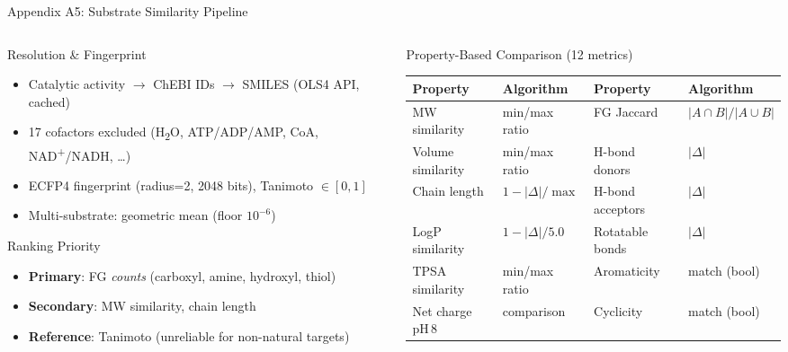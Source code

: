 \documentclass[aspectratio=169, 11pt]{beamer}
\begin{document}
\begin{frame}{Appendix A5: Substrate Similarity Pipeline}
\vspace{-8pt}
\begin{columns}[T]
\begin{column}{0.48\textwidth}
\begin{block}{\small Resolution \& Fingerprint}
\vspace{-2pt}
\begin{itemize}\scriptsize
\setlength\itemsep{0pt}
\item Catalytic activity $\rightarrow$ ChEBI IDs $\rightarrow$ SMILES (OLS4 API, cached)
\item 17 cofactors excluded (H\textsubscript{2}O, ATP/ADP/AMP, CoA, NAD\textsuperscript{+}/NADH, \ldots)
\item ECFP4 fingerprint (radius=2, 2048 bits), Tanimoto $\in [0,1]$
\item Multi-substrate: geometric mean (floor $10^{-6}$)
\end{itemize}
\end{block}

\begin{alertblock}{\small Ranking Priority}
\vspace{-2pt}
\begin{itemize}\scriptsize
\setlength\itemsep{-1pt}
\item \textbf{Primary}: FG \textit{counts} (carboxyl, amine, hydroxyl, thiol)
\item \textbf{Secondary}: MW similarity, chain length
\item \textbf{Reference}: Tanimoto (unreliable for non-natural targets)
\end{itemize}
\end{alertblock}
\end{column}
\begin{column}{0.48\textwidth}
\begin{exampleblock}{\small Property-Based Comparison (12 metrics)}
\vspace{-2pt}
{\tiny
\begin{tabular}{@{}l l | l l@{}}
\toprule
\textbf{Property} & \textbf{Algorithm} & \textbf{Property} & \textbf{Algorithm} \\
\midrule
MW similarity & min/max ratio & FG Jaccard & $|A \cap B| / |A \cup B|$ \\
Volume similarity & min/max ratio & H-bond donors & $|\Delta|$ \\
Chain length & $1 - |\Delta| / \max$ & H-bond acceptors & $|\Delta|$ \\
LogP similarity & $1 - |\Delta| / 5.0$ & Rotatable bonds & $|\Delta|$ \\
TPSA similarity & min/max ratio & Aromaticity & match (bool) \\
Net charge pH\,8 & comparison & Cyclicity & match (bool) \\
\bottomrule
\end{tabular}
}
\end{exampleblock}


\end{column}
\end{columns}
\end{frame}
\end{document}
